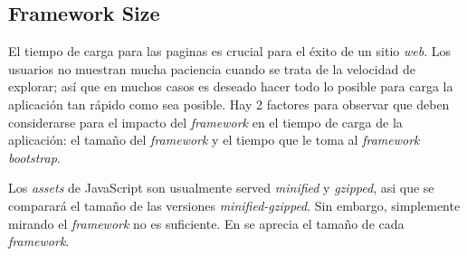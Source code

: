 

\subsection{Framework Size}

El tiempo de carga para las paginas es crucial para el éxito de un sitio \textit{web}. Los usuarios no muestran mucha paciencia cuando se trata de la velocidad de explorar; así que en muchos casos es deseado hacer todo lo posible para carga la aplicación tan rápido como sea posible. Hay 2 factores para observar que deben considerarse para el impacto del \textit{framework} en el tiempo de carga de la aplicación: el tamaño del \textit{framework} y el tiempo que le toma al \textit{framework} \textit{bootstrap}.

Los \textit{assets} de JavaScript son usualmente served \textit{minified} y \textit{gzipped}, asi que se comparará el tamaño de las versiones \textit{minified-gzipped}. Sin embargo, simplemente mirando el \textit{framework} no es suficiente. En  se aprecia el tamaño de cada \textit{framework}.

